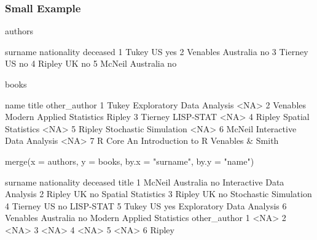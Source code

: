 \documentclass[10pt,american]{beamer}
\renewenvironment{Schunk}{}{}
\renewenvironment{Sinput}{}{}
\begin{document}
\begin{frame}
\frametitle{Small Example}

\begin{Schunk}
\begin{Sinput}
 authors
\end{Sinput}
\begin{Soutput}
   surname nationality deceased
1    Tukey          US      yes
2 Venables   Australia       no
3  Tierney          US       no
4   Ripley          UK       no
5   McNeil   Australia       no
\end{Soutput}
\begin{Sinput}
 books
\end{Sinput}
\begin{Soutput}
      name                     title     other_author
1    Tukey Exploratory Data Analysis             <NA>
2 Venables Modern Applied Statistics           Ripley
3  Tierney                 LISP-STAT             <NA>
4   Ripley        Spatial Statistics             <NA>
5   Ripley     Stochastic Simulation             <NA>
6   McNeil Interactive Data Analysis             <NA>
7   R Core      An Introduction to R Venables & Smith
\end{Soutput}
\begin{Sinput}
 merge(x = authors, y = books, by.x = "surname", by.y = "name")
\end{Sinput}
\begin{Soutput}
   surname nationality deceased                     title
1   McNeil   Australia       no Interactive Data Analysis
2   Ripley          UK       no        Spatial Statistics
3   Ripley          UK       no     Stochastic Simulation
4  Tierney          US       no                 LISP-STAT
5    Tukey          US      yes Exploratory Data Analysis
6 Venables   Australia       no Modern Applied Statistics
  other_author
1         <NA>
2         <NA>
3         <NA>
4         <NA>
5         <NA>
6       Ripley
\end{Soutput}
\end{Schunk}
\end{frame}
\end{document}
